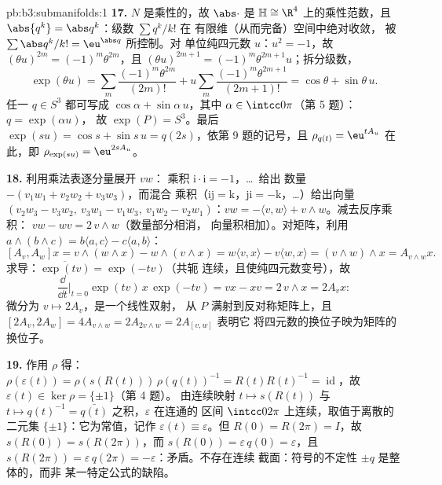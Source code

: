 \begin{solution}{pb:b3:submanifolds:1}
\textbf{17.} $N$ 是乘性的，故 $\abs\cdot$ 是
$\mathbb H \cong \R^4$ 上的乘性范数，且
$\abs{q^k} = \abs q^k$：级数 $\sum q^k/k!$ 在
有限维（从而完备）空间中绝对收敛，
被 $\sum\abs q^k/k! = \eu^{\abs q}$ 所控制。对
单位纯四元数 $u$：$u^2 = -1$，故 $(\theta u)^{2m} =
(-1)^m\theta^{2m}$，且 $(\theta u)^{2m+1} =
(-1)^m\theta^{2m+1}u$；拆分级数，
\[
\exp(\theta u) = \sum_m\frac{(-1)^m\theta^{2m}}{(2m)!} +
u\sum_m\frac{(-1)^m\theta^{2m+1}}{(2m+1)!} = \cos\theta +
\sin\theta\,u .
\]
任一 $q \in S^3$ 都可写成 $\cos\alpha + \sin\alpha\,u$，其中
$\alpha \in \intcc0\pi$（第 5 题）：$q = \exp(\alpha u)$，
故 $\exp(P) = S^3$。最后 $\exp(su) = \cos s + \sin s\,u
= q(2s)$，依第 9 题的记号，且 $\rho_{q(t)} =
\eu^{tA_u}$ 在此，即 $\rho_{\exp(su)} = \eu^{2sA_u}$。

\textbf{18.} 利用乘法表逐分量展开 $vw$：
乘积 $\mathrm i\cdot\mathrm i = -1$，\dots\ 给出
数量 $-(v_1w_1 + v_2w_2 + v_3w_3)$，而混合
乘积（$\mathrm{ij} = \mathrm k$，$\mathrm{ji} =
-\mathrm k$，\dots）给出向量 $(v_2w_3 - v_3w_2,\
v_3w_1 - v_1w_3,\ v_1w_2 - v_2w_1)$：$vw = -\langle v,
w\rangle + v\wedge w$。减去反序乘积：
$vw - wv = 2\,v\wedge w$（数量部分相消，
向量积相加）。对矩阵，利用 $a\wedge(b\wedge
c) = b\langle a, c\rangle - c\langle a, b\rangle$：
\[
[A_v, A_w]x = v\wedge(w\wedge x) - w\wedge(v\wedge x)
= w\langle v, x\rangle - v\langle w, x\rangle
= (v\wedge w)\wedge x = A_{v\wedge w}x .
\]
求导：$\overline{\exp(tv)} = \exp(-tv)$（共轭
连续，且使纯四元数变号），故
\[
\frac{\dd}{\dd t}\Bigr|_{t=0}\exp(tv)\,x\,\exp(-tv) = vx -
xv = 2\,v\wedge x = 2A_vx :
\]
微分为 $v \mapsto 2A_v$，是一个线性双射，
从 $P$ 满射到反对称矩阵上，且 $[2A_v, 2A_w]
= 4A_{v\wedge w} = 2A_{2v\wedge w} = 2A_{[v,w]}$ 表明它
将四元数的换位子映为矩阵的
换位子。

\textbf{19.} 作用 $\rho$ 得：$\rho(\varepsilon(t)) =
\rho(s(R(t)))\,\rho(q(t))^{-1} = R(t)R(t)^{-1} =
\operatorname{id}$，故 $\varepsilon(t) \in \ker\rho =
\{\pm1\}$（第 4 题）。
由连续映射 $t \mapsto s(R(t))$ 与 $t \mapsto q(t)^{-1} =
\bar{q(t)}$ 之积，$\varepsilon$ 在连通的
区间 $\intcc0{2\pi}$ 上连续，取值于离散的
二元集 $\{\pm1\}$：它为常值，记作 $\varepsilon(t) \equiv
\varepsilon$。但 $R(0) = R(2\pi) = I$，故 $s(R(0)) =
s(R(2\pi))$，而 $s(R(0)) = \varepsilon\,q(0) =
\varepsilon$，且 $s(R(2\pi)) = \varepsilon\,q(2\pi) =
-\varepsilon$：矛盾。不存在连续
截面：符号的不定性 $\pm q$ 是整体的，而非
某一特定公式的缺陷。


\end{solution}
